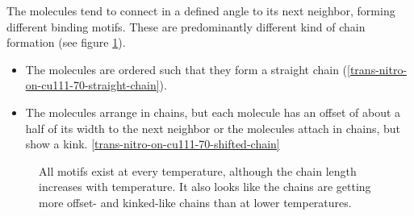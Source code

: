 	The molecules tend to connect in a defined angle to its next neighbor, forming different binding motifs. These are predominantly different kind of chain formation (see figure \ref{fig:two-leg-trans-cu111-motifs}).
	\begin{itemize}
		\item The molecules are ordered such that they form a straight chain (\autoref{trans-nitro-on-cu111-70-straight-chain}).
		\item The molecules arrange in chains, but each molecule has an offset of about a half of its width to the next neighbor or the molecules attach in chains, but show a kink. \autoref{trans-nitro-on-cu111-70-shifted-chain}
	\end{itemize}
	
	\begin{figure}[h]
		\centering
		 \qquad
		\caption{All motifs exist at every temperature, although the chain length increases with temperature. It also looks like the chains are getting more offset- and kinked-like chains than at lower temperatures.}
		\label{fig:two-leg-trans-cu111-motifs}
	\end{figure}
	
